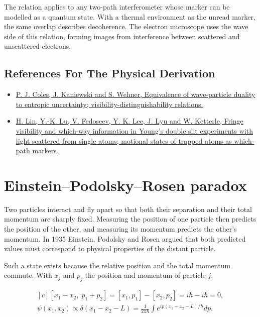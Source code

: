 \documentclass[11pt,oneside]{book}
\newenvironment{centeredalign}{\[\begin{gathered}[c]}{\end{gathered}\]}
\begin{document}
The relation applies to any two-path interferometer whose marker can be modelled as a quantum state. With a thermal environment as the unread marker, the same overlap describes decoherence. The electron microscope uses the wave side of this relation, forming images from interference between scattered and unscattered electrons.

\subsection*{References For The Physical Derivation}
\begin{itemize}
\item \href{https://arxiv.org/abs/1403.4687}{P. J. Coles, J. Kaniewski and S. Wehner, Equivalence of wave-particle duality to entropic uncertainty; visibility-distinguishability relations.}
\item \href{https://arxiv.org/abs/2507.19801}{H. Lin, Y.-K. Lu, V. Fedoseev, Y. K. Lee, J. Lyu and W. Ketterle, Fringe visibility and which-way information in Young's double slit experiments with light scattered from single atoms; motional states of trapped atoms as which-path markers.}
\end{itemize}





\clearpage

\section{Einstein–Podolsky–Rosen paradox}

\label{topic:einstein-podolsky-rosen-paradox}

Two particles interact and fly apart so that both their separation and their total momentum are sharply fixed. Measuring the position of one particle then predicts the position of the other, and measuring its momentum predicts the other's momentum. In 1935 Einstein, Podolsky and Rosen argued that both predicted values must correspond to physical properties of the distant particle.

Such a state exists because the relative position and the total momentum commute. With \(x_j\) and \(p_j\) the position and momentum of particle \(j\),

\begin{centeredalign}
[x_1-x_2,\;p_1+p_2]=[x_1,p_1]-[x_2,p_2]=i\hbar-i\hbar=0,\\
\psi(x_1,x_2)\propto\delta(x_1-x_2-L)=\frac{1}{2\pi\hbar}\int e^{ip(x_1-x_2-L)/\hbar}dp.
\end{centeredalign}
\end{document}
